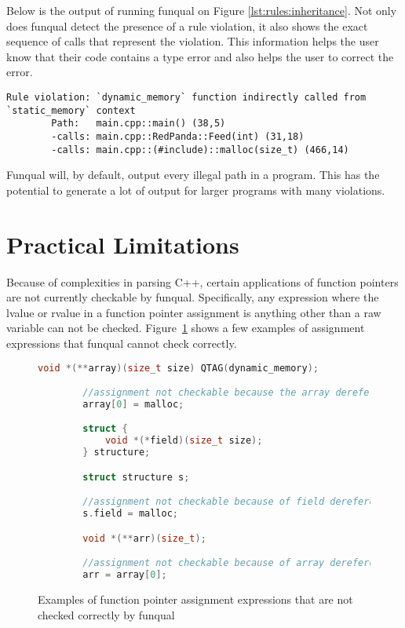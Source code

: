 Below is the output of running funqual on Figure \ref{lst:rules:inheritance}.  Not only does funqual detect the presence of a rule violation, it also shows the exact sequence of calls that represent the violation.  This information helps the user know that their code contains a type error and also helps the user to correct the error.

\noindent\begin{minipage}[t]{\linewidth}
\begin{lstlisting}
Rule violation: `dynamic_memory` function indirectly called from `static_memory` context
        Path:   main.cpp::main() (38,5)
        -calls: main.cpp::RedPanda::Feed(int) (31,18)
        -calls: main.cpp::(#include)::malloc(size_t) (466,14)
\end{lstlisting}
\end{minipage}

Funqual will, by default, output every illegal path in a program.  This has the potential to generate a lot of output for larger programs with many violations.  

\section{Practical Limitations}

Because of complexities in parsing C++, certain applications of function pointers are not currently checkable by funqual.  Specifically, any expression where the lvalue or rvalue in a function pointer assignment is anything other than a raw variable can not be checked.  Figure~\ref{sec:imp:funptrfails} shows a few examples of assignment expressions that funqual cannot check correctly.

\begin{figure}
    \begin{lstlisting}[language=c++,gobble=8]
        void *(**array)(size_t size) QTAG(dynamic_memory);

        //assignment not checkable because the array dereference in lvalue
        array[0] = malloc;

        struct {
            void *(*field)(size_t size);
        } structure;

        struct structure s;

        //assignment not checkable because of field dereference in lvalue
        s.field = malloc;

        void *(**arr)(size_t);

        //assignment not checkable because of array dereference in rvalue
        arr = array[0];
    \end{lstlisting}
    \caption{Examples of function pointer assignment expressions that are not checked correctly by funqual}
    \label{sec:imp:funptrfails}
\end{figure}

